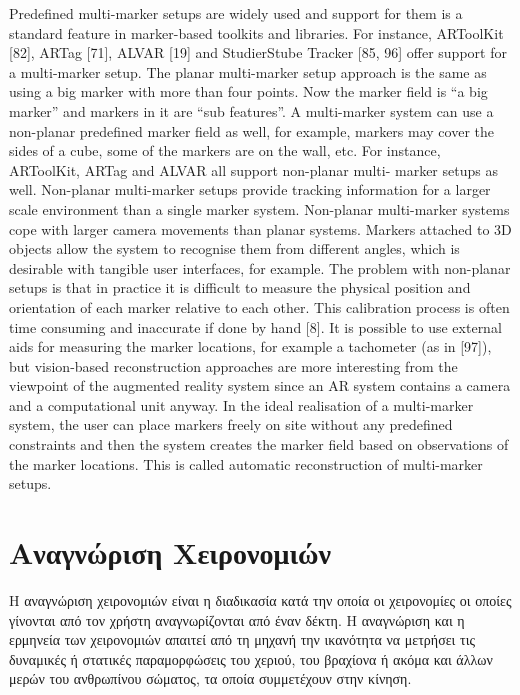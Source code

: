 Predefined multi-marker setups are widely used and support for them is a standard
feature in marker-based toolkits and libraries. For instance, ARToolKit [82],
ARTag [71], ALVAR [19] and StudierStube Tracker [85, 96] offer support for a
multi-marker setup. The planar multi-marker setup approach is the same as using
a big marker with more than four points. Now the marker field is “a big marker” and
markers in it are “sub features”.
A multi-marker system can use a non-planar predefined marker field as well, for
example, markers may cover the sides of a cube, some of the markers are on the
wall, etc. For instance, ARToolKit, ARTag and ALVAR all support non-planar multi-
marker setups as well. Non-planar multi-marker setups provide tracking information
for a larger scale environment than a single marker system. Non-planar
multi-marker systems cope with larger camera movements than planar systems.
Markers attached to 3D objects allow the system to recognise them from different
angles, which is desirable with tangible user interfaces, for example.
The problem with non-planar setups is that in practice it is difficult to measure
the physical position and orientation of each marker relative to each other. This
calibration process is often time consuming and inaccurate if done by hand [8]. It
is possible to use external aids for measuring the marker locations, for example a
tachometer (as in [97]), but vision-based reconstruction approaches are more
interesting from the viewpoint of the augmented reality system since an AR system
contains a camera and a computational unit anyway.
In the ideal realisation of a multi-marker system, the user can place markers
freely on site without any predefined constraints and then the system creates the
marker field based on observations of the marker locations. This is called automatic
reconstruction of multi-marker setups.






\section{Αναγνώριση Χειρονομιών}



H αναγνώριση χειρονομιών είναι η διαδικασία κατά την οποία οι χειρονομίες οι οποίες γίνονται από τον χρήστη αναγνωρίζονται από έναν δέκτη. Η αναγνώριση και η ερμηνεία των χειρονομιών απαιτεί από τη μηχανή την ικανότητα να μετρήσει τις δυναμικές ή στατικές παραμορφώσεις του χεριού, του βραχίονα ή ακόμα και άλλων μερών του ανθρωπίνου σώματος, τα οποία συμμετέχουν στην κίνηση.

